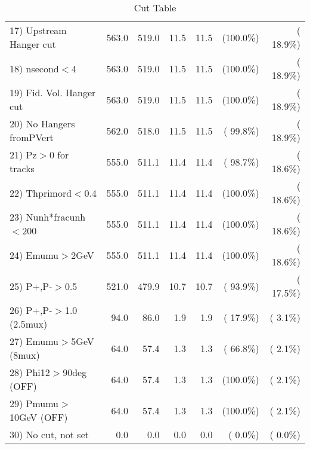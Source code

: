 \begin{table}[h!]
\begin{tabular}{||l||r|r|r|r|r|r||}
 17) Upstream Hanger cut  &        563.0 &        519.0 &         11.5 &         11.5 & (100.0\%) & ( 18.9\%) \\
 18) nsecond$<$4          &        563.0 &        519.0 &         11.5 &         11.5 & (100.0\%) & ( 18.9\%) \\
 19) Fid. Vol. Hanger cut &        563.0 &        519.0 &         11.5 &         11.5 & (100.0\%) & ( 18.9\%) \\
 20) No Hangers fromPVert &        562.0 &        518.0 &         11.5 &         11.5 & ( 99.8\%) & ( 18.9\%) \\
 21) Pz$>$0 for tracks    &        555.0 &        511.1 &         11.4 &         11.4 & ( 98.7\%) & ( 18.6\%) \\
 22) Thprimord$<$0.4      &        555.0 &        511.1 &         11.4 &         11.4 & (100.0\%) & ( 18.6\%) \\
 23) Nunh*fracunh$<$200   &        555.0 &        511.1 &         11.4 &         11.4 & (100.0\%) & ( 18.6\%) \\
 24) Emumu$>$2GeV         &        555.0 &        511.1 &         11.4 &         11.4 & (100.0\%) & ( 18.6\%) \\
 25) P+,P-$>$0.5          &        521.0 &        479.9 &         10.7 &         10.7 & ( 93.9\%) & ( 17.5\%) \\
 26) P+,P-$>$1.0 (2.5mux) &         94.0 &         86.0 &          1.9 &          1.9 & ( 17.9\%) & (  3.1\%) \\
 27) Emumu$>$5GeV  (8mux) &         64.0 &         57.4 &          1.3 &          1.3 & ( 66.8\%) & (  2.1\%) \\
 28) Phi12$>$90deg  (OFF) &         64.0 &         57.4 &          1.3 &          1.3 & (100.0\%) & (  2.1\%) \\
 29) Pmumu$>$10GeV  (OFF) &         64.0 &         57.4 &          1.3 &          1.3 & (100.0\%) & (  2.1\%) \\
 30) No cut, not set      &          0.0 &          0.0 &          0.0 &          0.0 & (  0.0\%) & (  0.0\%) \\
 \hline
 \hline
 \end{tabular}
 \caption{Cut Table           }
 \label{tab-cutheavy_neutrino_4.000}
 \end{table}
